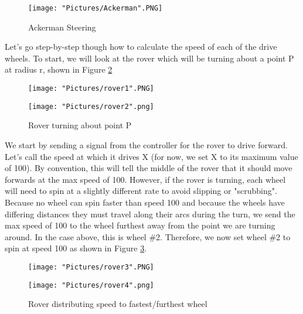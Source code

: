 \documentclass[12pt]{article}
\begin{document}
\begin{figure}[H]
 	\centering
	\texttt{[image: "Pictures/Ackerman".PNG]}
 	\caption{Ackerman Steering}
	\label{Ackerman}
\end{figure}

Let's go step-by-step though how to calculate the speed of each of the drive wheels. To start, we will look at the rover which will be turning about a point P at radius r, shown in Figure \ref{r1}


\begin{figure}[H]
 	\centering
  	\begin{minipage}[b]{0.45\textwidth}
		\texttt{[image: "Pictures/rover1".PNG]}
  	\end{minipage}
  	\hfill
  	\begin{minipage}[b]{0.45\textwidth}
    		\texttt{[image: "Pictures/rover2".png]}
  	\end{minipage}
  	\caption{Rover turning about point P}
	\label{r1}
\end{figure}

\noindent We start by sending a signal from the controller for the rover to drive forward. Let's call the speed at which it drives X (for now, we set X to its maximum value of 100). By convention, this will tell the middle of the rover that it should move forwards at the max speed of 100. However, if the rover is turning, each wheel will need to spin at a slightly different rate to avoid slipping or "scrubbing". Because no wheel can spin faster than speed 100 and because the wheels have differing distances they must travel along their arcs during the turn, we send the max speed of 100 to the wheel furthest away from the point we are turning around. In the case above, this is wheel \#2. Therefore, we now set wheel \#2 to spin at speed 100 as shown in Figure \ref{r2}.  

\begin{figure}[H]
 	\centering
  	\begin{minipage}[b]{0.45\textwidth}
		\texttt{[image: "Pictures/rover3".PNG]}
  	\end{minipage}
  	\hfill
  	\begin{minipage}[b]{0.45\textwidth}
    		\texttt{[image: "Pictures/rover4".png]}
  	\end{minipage}
  	\caption{Rover distributing speed to fastest/furthest wheel}
	\label{r2}
\end{figure}
\end{document}
